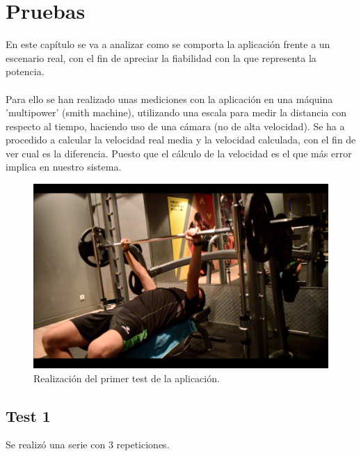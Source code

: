 \chapter{Pruebas}

En este capítulo se va a analizar como se comporta la aplicación frente a un escenario real, con el fin de apreciar la fiabilidad con la que representa la potencia.
\\
\\
Para ello se han realizado unas mediciones con la aplicación en una máquina 'multipower' (smith machine), utilizando una escala para medir la distancia con respecto al tiempo, haciendo uso de una cámara (no de alta velocidad). Se ha a procedido a calcular la velocidad real media y la velocidad calculada, con el fin de ver cual es la diferencia. Puesto que el cálculo de la velocidad es el que más error implica en nuestro sistema.

\begin{figure}[H]
	\centering
	\includegraphics[scale=0.2]{imagenes/prueba1.png}
	\caption{Realización del primer test de la aplicación.}
	\label{Realización test}
\end{figure}

\section*{Test 1}

Se realizó una serie con 3 repeticiones.


